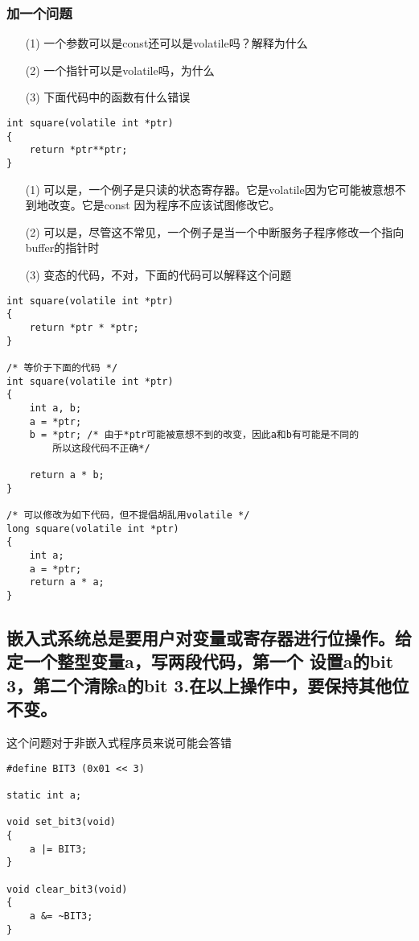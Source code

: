 \documentclass{article}
\begin{document}
\subsubsection{加一个问题}
\begin{itemize}
\item[(1)]一个参数可以是const还可以是volatile吗？解释为什么
\item[(2)]一个指针可以是volatile吗，为什么
\item[(3)]下面代码中的函数有什么错误
\end{itemize}
\begin{verbatim}
int square(volatile int *ptr)
{
	return *ptr**ptr;
}
\end{verbatim}
\begin{itemize}
\item[(1)] 可以是，一个例子是只读的状态寄存器。它是volatile因为它可能被意想不到地改变。它是const
因为程序不应该试图修改它。
\item[(2)] 可以是，尽管这不常见，一个例子是当一个中断服务子程序修改一个指向buffer的指针时
\item[(3)] 变态的代码，不对，下面的代码可以解释这个问题
\end{itemize}

\begin{verbatim}
int square(volatile int *ptr)
{
	return *ptr * *ptr;
}

/* 等价于下面的代码 */
int square(volatile int *ptr)
{
	int a, b;
	a = *ptr;
	b = *ptr; /* 由于*ptr可能被意想不到的改变，因此a和b有可能是不同的
		所以这段代码不正确*/

	return a * b;
}

/* 可以修改为如下代码，但不提倡胡乱用volatile */
long square(volatile int *ptr)
{
	int a;
	a = *ptr;
	return a * a;
}
\end{verbatim}

\subsection{嵌入式系统总是要用户对变量或寄存器进行位操作。给定一个整型变量a，写两段代码，第一个
设置a的bit 3，第二个清除a的bit 3.在以上操作中，要保持其他位不变。}
这个问题对于非嵌入式程序员来说可能会答错


\begin{verbatim}
#define BIT3 (0x01 << 3)

static int a;

void set_bit3(void)
{
	a |= BIT3;
}

void clear_bit3(void)
{
	a &= ~BIT3;
}

\end{verbatim}
\end{document}
